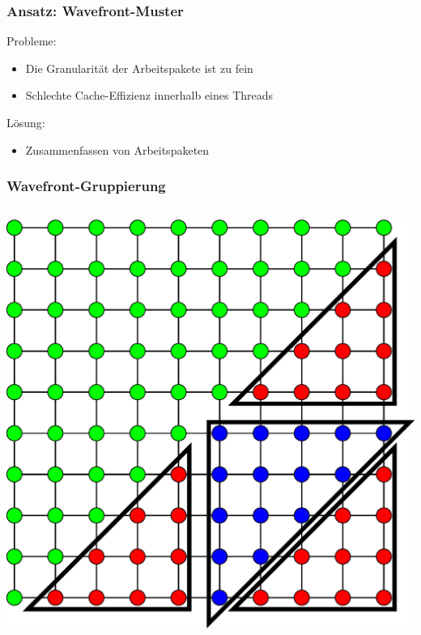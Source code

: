 \documentclass{beamer}
\begin{document}
\begin{frame}
    \frametitle{Ansatz: Wavefront-Muster}
    Probleme:
    \begin{itemize}
        \item Die Granularität der Arbeitspakete ist zu fein
        \item Schlechte Cache-Effizienz innerhalb eines Threads
    \end{itemize}
    Lösung:
    \begin{itemize}
        \item Zusammenfassen von Arbeitspaketen
    \end{itemize}
\end{frame}

\begin{frame}
    \frametitle{Wavefront-Gruppierung}
    \begin{columns}
        \begin{column}{0.5\textwidth}
            \includegraphics[width=\textwidth]{triangles1}
                        

\end{column}
\end{columns}
\end{frame}
\end{document}
